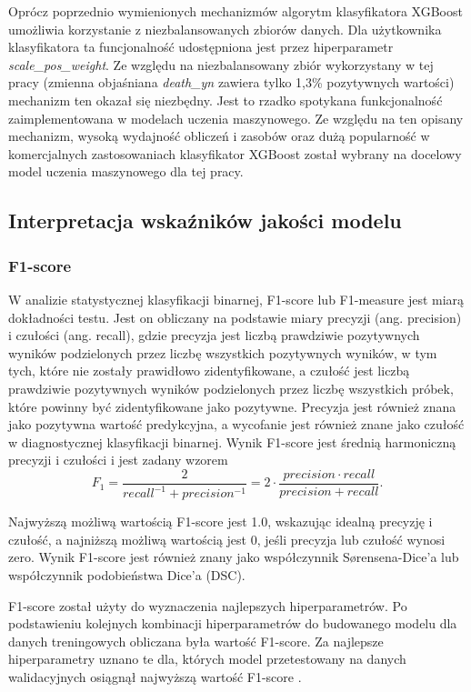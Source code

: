\documentclass[polish, twoside, 12pt, a4paper]{article}
\theoremstyle{definition}
\theoremstyle{plain}
\theoremstyle{remark}
\begin{document}
Oprócz poprzednio wymienionych mechanizmów algorytm klasyfikatora XGBoost umożliwia korzystanie z niezbalansowanych zbiorów danych. Dla użytkownika klasyfikatora ta funcjonalność udostępniona jest przez hiperparametr \emph{scale\_pos\_weight}. Ze względu na niezbalansowany zbiór wykorzystany w tej pracy (zmienna objaśniana \emph{death\_yn} zawiera tylko 1,3\% pozytywnych wartości) mechanizm ten okazał się niezbędny. Jest to rzadko spotykana funkcjonalność zaimplementowana w modelach uczenia maszynowego. Ze względu na ten opisany mechanizm, wysoką wydajność obliczeń i zasobów oraz dużą popularność w komercjalnych zastosowaniach klasyfikator XGBoost został wybrany na docelowy model uczenia maszynowego dla tej pracy. 

\subsection{Interpretacja wskaźników jakości modelu}

\subsubsection{F1-score}

W analizie statystycznej klasyfikacji binarnej, F1-score lub F1-measure jest miarą dokładności testu. Jest on obliczany na podstawie miary precyzji (ang. precision) i czułości (ang. recall), gdzie precyzja jest liczbą prawdziwie pozytywnych wyników podzielonych przez liczbę wszystkich pozytywnych wyników, w tym tych, które nie zostały prawidłowo zidentyfikowane, a czułość jest liczbą prawdziwie pozytywnych wyników podzielonych przez liczbę wszystkich próbek, które powinny być zidentyfikowane jako pozytywne. Precyzja jest również znana jako pozytywna wartość predykcyjna, a wycofanie jest również znane jako czułość w diagnostycznej klasyfikacji binarnej. Wynik F1-score jest średnią harmoniczną precyzji i czułości i jest zadany wzorem
\[ 
  F_1 = \frac{2}{recall^{-1} + precision^{-1}} = 2 \cdot \frac{precision \cdot recall}{precision + recall}.
\]

Najwyższą możliwą wartością F1-score jest 1.0, wskazując idealną precyzję i czułość, a najniższą możliwą wartością jest 0, jeśli precyzja lub czułość wynosi zero. Wynik F1-score jest również znany jako współczynnik Sørensena-Dice'a lub współczynnik podobieństwa Dice'a (DSC).



F1-score został użyty do wyznaczenia najlepszych hiperparametrów. Po podstawieniu kolejnych kombinacji hiperparametrów do budowanego modelu dla danych treningowych obliczana była wartość F1-score. Za najlepsze hiperparametry uznano te dla, których model przetestowany na danych walidacyjnych osiągnął najwyższą wartość F1-score \cite{tharwat2018}.
\end{document}
